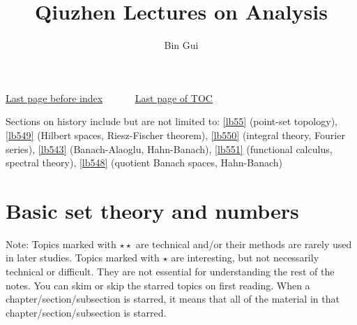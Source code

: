 \documentclass[12pt,b5paper,notitlepage]{article}
\title{Qiuzhen Lectures on Analysis}
\author{{\sc Bin Gui}
}
\theoremstyle{definition}
\theoremstyle{plain}
\numberwithin{equation}{section}
\begin{document}
\sloppy %
	\setcounter{page}{1}



	









	
	\maketitle
\small  \hyperlink{beforeindex}{Last page before index}~~~~~~   \hyperlink{page.4}{Last page of TOC}

\noindent Sections on history include but are not limited to: 
\ref{lb55} (point-set topology), \ref{lb549} (Hilbert spaces, Riesz-Fischer theorem), \ref{lb550} (integral theory, Fourier series), \ref{lb543} (Banach-Alaoglu, Hahn-Banach), \ref{lb551} (functional calculus, spectral theory), \ref{lb548} (quotient Banach spaces, Hahn-Banach)
\normalsize



\makeatletter
\newcommand*{\toccontents}{}
\makeatother
\toccontents

\hypertarget{endoftoc}{}

	


\newpage

\section{Basic set theory and numbers}


Note: Topics marked with $\star\star$ are technical and/or their methods are rarely used in later studies. Topics marked with $\star$ are interesting, but not necessarily technical or difficult. They are not essential for understanding the rest of the notes. You can skim or skip the starred topics on first reading. When a chapter/section/subsection is starred, it means that all of the material in that chapter/section/subsection is starred.
\end{document}
